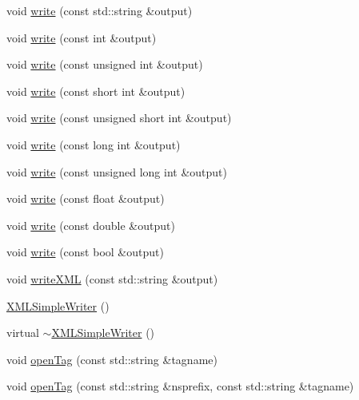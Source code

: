 \begin{DoxyCompactItemize}
\item 
void \mbox{\hyperlink{classXMLWriterAPI_1_1XMLSimpleWriter_aea3a2b15335f16a80149d21976e3afa2}{write}} (const std\+::string \&output)
\item 
void \mbox{\hyperlink{classXMLWriterAPI_1_1XMLSimpleWriter_aab5e5f9784f35d1263f925daad236aa1}{write}} (const int \&output)
\item 
void \mbox{\hyperlink{classXMLWriterAPI_1_1XMLSimpleWriter_aa3dc69980c2d837e53da334379a141e9}{write}} (const unsigned int \&output)
\item 
void \mbox{\hyperlink{classXMLWriterAPI_1_1XMLSimpleWriter_a442689bf3d534b9b225232f120fd8580}{write}} (const short int \&output)
\item 
void \mbox{\hyperlink{classXMLWriterAPI_1_1XMLSimpleWriter_a965d989252cdd0dafe8112fb837c4a97}{write}} (const unsigned short int \&output)
\item 
void \mbox{\hyperlink{classXMLWriterAPI_1_1XMLSimpleWriter_ab5bb6ad4186f685635d599d3396d5af4}{write}} (const long int \&output)
\item 
void \mbox{\hyperlink{classXMLWriterAPI_1_1XMLSimpleWriter_abebc2bdc534cb2fc312083325fa82f49}{write}} (const unsigned long int \&output)
\item 
void \mbox{\hyperlink{classXMLWriterAPI_1_1XMLSimpleWriter_a70850b3c754b1f9e657a6f149be6a1b2}{write}} (const float \&output)
\item 
void \mbox{\hyperlink{classXMLWriterAPI_1_1XMLSimpleWriter_a58aa8eec4365f4ca7a31b7a874f67df4}{write}} (const double \&output)
\item 
void \mbox{\hyperlink{classXMLWriterAPI_1_1XMLSimpleWriter_accfee15ab7b6c267b81b82d8a798da11}{write}} (const bool \&output)
\item 
void \mbox{\hyperlink{classXMLWriterAPI_1_1XMLSimpleWriter_af4378ccb1442a3176f4548970f328537}{write\+X\+ML}} (const std\+::string \&output)
\item 
\mbox{\hyperlink{classXMLWriterAPI_1_1XMLSimpleWriter_aa22ad5550ae58f1a9dc9056c4d342d8b}{X\+M\+L\+Simple\+Writer}} ()
\item 
virtual \mbox{\hyperlink{classXMLWriterAPI_1_1XMLSimpleWriter_aa4dd6f9d05c34b7a0d27d1e7e4773f4c}{$\sim$\+X\+M\+L\+Simple\+Writer}} ()
\item 
void \mbox{\hyperlink{classXMLWriterAPI_1_1XMLSimpleWriter_aaddd3b55ffc11672fef8ce464f2882c4}{open\+Tag}} (const std\+::string \&tagname)
\item 
void \mbox{\hyperlink{classXMLWriterAPI_1_1XMLSimpleWriter_aabef4c9b78d0f9528a0fa0989df1e22e}{open\+Tag}} (const std\+::string \&nsprefix, const std\+::string \&tagname)

\end{DoxyCompactItemize}
